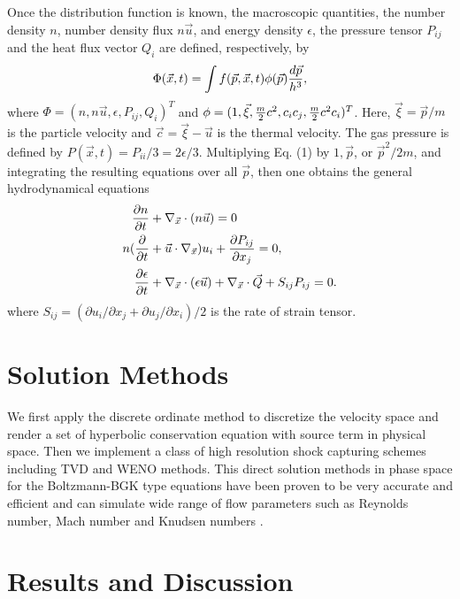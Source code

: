 \documentclass[twocolumn,prX]{revtex4} %
\begin{document}
Once the distribution function is known, the macroscopic quantities, the
number density $n$, number density flux $n \vec u$, and energy density $\epsilon$, the pressure tensor $P_{ij}$
and the heat flux vector $Q_{i}$ are defined, respectively, by
\begin{align}
\Phi (\vec x, t) = \int  f(\vec p, \vec x, t) \phi(\vec p){d \vec p \over h^3},
\end{align}
where $\Phi =(n, n\vec u, \epsilon, P_{ij}, Q_{i})^T$ and $\phi=(1, \vec \xi, {m\over 2} c^2, c_{i}
c_{j}, {m\over 2}c^2 c_{i} )^T$.  Here, $\vec \xi =\vec
p/m$ is the particle velocity and $\vec c= \vec \xi - \vec u$ is
the thermal velocity.  The gas pressure is defined by $P(\vec x, t) = P_{i i}/3 = 2 \epsilon /3$.
Multiplying Eq. (1) by $1, \vec p$, or $\vec
p^2/2m$, and integrating the resulting equations over all $\vec
p$, then one obtains the general hydrodynamical equations
\begin{align}
{ \partial n \over \partial t} &+ \nabla_{\vec x} \cdot
(n \vec u) = 0 \\
n ( { \partial  \over \partial t} &+ \vec u \cdot \nabla_{\vec
x}) u_{i} + {\partial P_{ij} \over \partial
x_{j} } = 0, \\
{\partial \epsilon \over \partial t} &+ \nabla_{\vec x} \cdot
(\epsilon \vec u) + \nabla_{\vec x} \cdot \vec Q + S_{ij} P_{ij} = 0.
\end{align}
where $S_{ij}=(\partial u_{i}/\partial x_{j} +
\partial u_{j}/\partial x_{i})/2$ is the rate of strain tensor.

\section{Solution Methods}

We first apply the discrete ordinate method to discretize the velocity space and render a set of hyperbolic conservation equation with source term in physical space.  Then we implement a class of high resolution shock capturing schemes including TVD and WENO methods.   This direct solution methods in phase space for the Boltzmann-BGK type equations have been proven to be very accurate and efficient and can simulate wide range of flow parameters such as Reynolds number, Mach number and Knudsen numbers \cite{Yang1995, Yang2013}.

\section{Results and Discussion}
\end{document}

